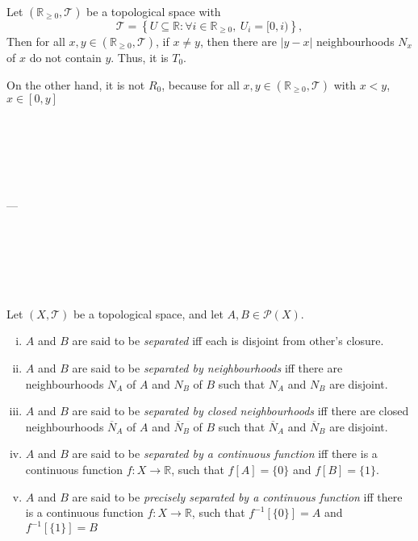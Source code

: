 \begin{example}
	\label{eg: T_0 but not T_1}
	Let $(\mathbb R_{\ge 0}, \mathcal T)$ be a topological space with
	$$
	\mathcal T = \left\{ U \subseteq \mathbb R : \forall i \in \mathbb R_{\ge 0}, \ U_i = [0, i)  \right\},
	$$
	Then for all $x,y \in (\mathbb R_{\ge 0}, \mathcal T)$, if $x \ne y$, then there are $|y - x|$ neighbourhoods $N_x$ of $x$ do not contain $y$. Thus, it is $T_0$.
	
	On the other hand, it is not $R_0$, because for all $x, y \in (\mathbb R_{\ge 0}, \mathcal T)$ with $x < y$, $x \in [0,y]$
\end{example}






\

\

\

---

\

\

\





\begin{definition}
	Let $(X, \mathcal T)$ be a topological space, and let $A, B \in \mathcal P(X)$.
	
	\begin{enumerate}[(i)]
		\item $A$ and $B$ are said to be \textit{separated} iff each is disjoint from other's closure.
		\item $A$ and $B$ are said to be \textit{separated by neighbourhoods} iff there are neighbourhoods $N_A$ of $A$ and $N_B$ of $B$ such that $N_A$ and $N_B$ are disjoint.
		\item $A$ and $B$ are said to be \textit{separated by closed neighbourhoods} iff there are closed neighbourhoods $\overline N_A$ of $A$ and $\overline N_B$ of $B$ such that $\overline N_A$ and $\overline N_B$ are disjoint.
		\item $A$ and $B$ are said to be \textit{separated by a continuous function} iff there is a continuous function $f: X \to \mathbb R$, such that $f[A] = \{0\}$ and $f[B] = \{1\}$.
		\item $A$ and $B$ are said to be \textit{precisely separated by a continuous function} iff there is a continuous function $f: X \to \mathbb R$, such that $f^{-1}[\{0\}] = A$ and $f^{-1}[\{1\}] = B$
	\end{enumerate}
\end{definition}






